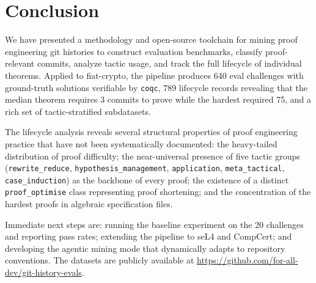 \documentclass[11pt]{article}
\begin{document}
\section{Conclusion}

We have presented a methodology and open-source toolchain for mining proof engineering git histories to construct evaluation benchmarks, classify proof-relevant commits, analyze tactic usage, and track the full lifecycle of individual theorems. Applied to fiat-crypto, the pipeline produces 640 eval challenges with ground-truth solutions verifiable by \texttt{coqc}, 789 lifecycle records revealing that the median theorem requires 3 commits to prove while the hardest required 75, and a rich set of tactic-stratified subdatasets.

The lifecycle analysis reveals several structural properties of proof engineering practice that have not been systematically documented: the heavy-tailed distribution of proof difficulty; the near-universal presence of five tactic groups (\texttt{rewrite\_reduce}, \texttt{hypothesis\_management}, \texttt{application}, \texttt{meta\_tactical}, \texttt{case\_induction}) as the backbone of every proof; the existence of a distinct \texttt{proof\_optimise} class representing proof shortening; and the concentration of the hardest proofs in algebraic specification files.

Immediate next steps are: running the baseline experiment on the 20 challenges and reporting pass rates; extending the pipeline to seL4 and CompCert; and developing the agentic mining mode that dynamically adapts to repository conventions. The datasets are publicly available at \url{https://github.com/for-all-dev/git-history-evals}.
\end{document}
